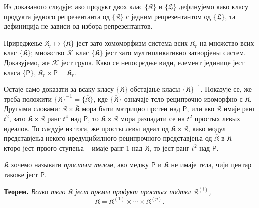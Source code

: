 \documentclass[11pt]{article}
\begin{document}
Из доказаного слєдује: ако продукт двох клас \(\{\mathfrak K\}\) и \(\{\mathfrak L\}\) дефинујемо како класу продукта једного репрезентанта од \(\{\mathfrak K\}\) с једним репрезентантом од \(\{\mathfrak L\}\), та дефиниција не зависи од избора репрезентантов.

Приреджење \(\mathfrak K_r\mapsto\{\mathfrak K\}\) јест зато хомоморфизм система всих \(\mathfrak K_r\) на множство всих клас \(\{\mathfrak K\}\); множство \(\mathscr K\) клас \(\{\mathfrak K\}\) јест зато мултипликативно затворјены систем. Доказујемо, же \(\mathscr K\) јест група. Како се непосрєдње види, елемент јединице јест класа \(\{\mathsf P\}\), \(\mathfrak K_r\times\mathsf P=\mathfrak K_r\).

Остаје само доказати за всаку класу \(\{\mathfrak K\}\) обстајање класы \(\{\mathfrak K\}^{-1}\). Показује се, же трєба положити \(\{\mathfrak K\}^{-1}=\{\overline{\mathfrak K}\}\), кде \(\{\overline{\mathfrak K}\}\) означаје тєло реципрочно изоморфно с \(\mathfrak K\). Другыми словами: \(\mathfrak K\times\overline{\mathfrak K}\) мора быти матрицно прстен над \(\mathsf P\), или ако \(\mathfrak K\) имаје ранг \(t^2\), зато \(\mathfrak K\times\overline{\mathfrak K}\) ранг \(t^4\) над \(\mathsf P\), то \(\mathfrak K\times\overline{\mathfrak K}\) мора разпадати се на \(t^2\) простых лєвых идеалов. То слєдује из тога, же просты лєвы идеал од \(\mathfrak K\times\overline{\mathfrak K}\), како модул прєдставјења некого иредуцибилного реципрочного прєдставјења од \(\overline{\mathfrak K}\) в \(\mathfrak K\) -- кторо јест првого ступења -- имаје ранг 1 над \(\mathfrak K\), то јест ранг \(t^2\) над \(\mathsf P\).

\(\mathfrak K\) хочемо называти \emph{простым тєлом}, ако меджу \(\mathsf P\) и \(\mathfrak K\) не имаје тєла, чији центар такоже јест \(\mathsf P\).

\textbf{Теорем.} \emph{Всако тєло \(\mathfrak K\) јест прємы продукт простых подтєл \(\mathfrak K^{(i)}\),}
\[
\mathfrak K=\mathfrak K^{(1)}\times\cdots\times\mathfrak K^{(p)}.
\]
\end{document}
